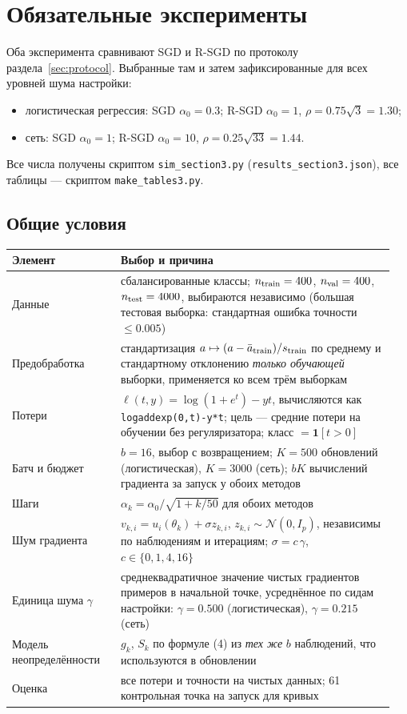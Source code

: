 \documentclass[11pt,a4paper]{article}
\begin{document}
\section{Обязательные эксперименты}\label{sec:sims}

Оба эксперимента сравнивают SGD и R-SGD по протоколу раздела~\ref{sec:protocol}. Выбранные там и
затем зафиксированные для всех уровней шума настройки:
\begin{itemize}
\item логистическая регрессия: SGD $\alpha_0=0.3$; R-SGD $\alpha_0=1$, $\rho=0.75\sqrt3=1.30$;
\item сеть: SGD $\alpha_0=1$; R-SGD $\alpha_0=10$, $\rho=0.25\sqrt{33}=1.44$.
\end{itemize}
Все числа получены скриптом \texttt{sim\_section3.py} (\texttt{results\_section3.json}), все
таблицы — скриптом \texttt{make\_tables3.py}.

\subsection{Общие условия}\label{sec:setup}


\begin{center}
\small
\begin{tabular}{@{}p{0.27\linewidth}p{0.68\linewidth}@{}}
\toprule
Элемент & Выбор и причина \\
\midrule
Данные & сбалансированные классы; $n_{\rm train}=400$, $n_{\rm val}=400$, $n_{\rm test}=4000$,
выбираются независимо (большая тестовая выборка: стандартная ошибка точности $\le0.005$) \\
Предобработка & стандартизация $a\mapsto(a-\bar a_{\rm train})/s_{\rm train}$ по среднему и
стандартному отклонению \emph{только обучающей} выборки, применяется ко всем трём выборкам \\
Потери & $\ell(t,y)=\log(1+e^t)-yt$, вычисляются как \texttt{logaddexp(0,t)-y*t}; цель —
средние потери на обучении без регуляризатора; класс $=\mathbf 1[t>0]$ \\
Батч и бюджет & $b=16$, выбор с возвращением; $K=500$ обновлений (логистическая), $K=3000$
(сеть); $bK$ вычислений градиента за запуск у обоих методов \\
Шаги & $\alpha_k=\alpha_0/\sqrt{1+k/50}$ для обоих методов \\
Шум градиента & $v_{k,i}=u_i(\theta_k)+\sigma z_{k,i}$, $z_{k,i}\sim\mathcal N(0,I_p)$, независимы
по наблюдениям и итерациям; $\sigma=c\,\gamma$, $c\in\{0,1,4,16\}$ \\
Единица шума $\gamma$ & среднеквадратичное значение чистых градиентов примеров в начальной
точке, усреднённое по сидам настройки: $\gamma=0.500$ (логистическая), $\gamma=0.215$ (сеть) \\
Модель неопределённости & $g_k$, $S_k$ по формуле (4) из \emph{тех же} $b$ наблюдений, что
используются в обновлении \\
Оценка & все потери и точности на чистых данных; 61 контрольная точка на запуск для кривых \\
\bottomrule
\end{tabular}
\end{center}
\end{document}
